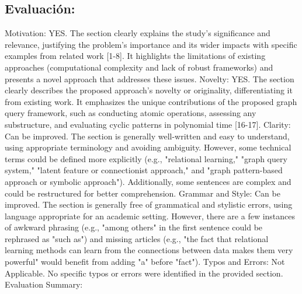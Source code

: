 \documentclass{article}%
\begin{document}
\subsection{Evaluación:}%
\label{subsec:Evaluacin}%
\newline%
Motivation: YES. The section clearly explains the study's significance and relevance, justifying the problem's importance and its wider impacts with specific examples from related work {[}1{-}8{]}. It highlights the limitations of existing approaches (computational complexity and lack of robust frameworks) and presents a novel approach that addresses these issues.\newline%
\newline%
Novelty: YES. The section clearly describes the proposed approach's novelty or originality, differentiating it from existing work. It emphasizes the unique contributions of the proposed graph query framework, such as conducting atomic operations, assessing any substructure, and evaluating cyclic patterns in polynomial time {[}16{-}17{]}.\newline%
\newline%
Clarity: Can be improved. The section is generally well{-}written and easy to understand, using appropriate terminology and avoiding ambiguity. However, some technical terms could be defined more explicitly (e.g., "relational learning," "graph query system," "latent feature or connectionist approach," and "graph pattern{-}based approach or symbolic approach"). Additionally, some sentences are complex and could be restructured for better comprehension.\newline%
\newline%
Grammar and Style: Can be improved. The section is generally free of grammatical and stylistic errors, using language appropriate for an academic setting. However, there are a few instances of awkward phrasing (e.g., "among others" in the first sentence could be rephrased as "such as") and missing articles (e.g., "the fact that relational learning methods can learn from the connections between data makes them very powerful" would benefit from adding "a" before "fact").\newline%
\newline%
Typos and Errors: Not Applicable. No specific typos or errors were identified in the provided section.\newline%
\newline%
Evaluation Summary:\newline%
\newline%
\end{document}
